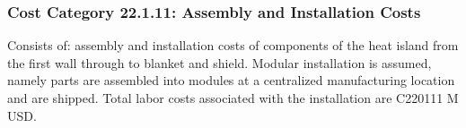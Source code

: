 \subsubsection*{Cost Category 22.1.11: Assembly and Installation Costs}
Consists of: assembly and installation costs of components of the heat island from the first wall through to blanket and shield.
Modular installation is assumed, namely parts are assembled into modules at a centralized manufacturing location and are shipped.
Total labor costs associated with the installation are C220111 M USD.
